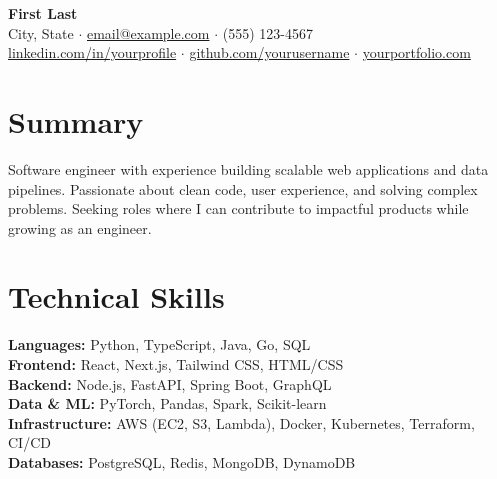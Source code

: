 \documentclass[11pt,letterpaper]{article}
\begin{document}
\begin{center}
    {\LARGE\bfseries\color{accent} %
    First Last} \\[4pt]
    City, State \quad $\cdot$ \quad
    \href{mailto:email@example.com}{email@example.com} \quad $\cdot$ \quad
    (555) 123-4567 \\
    \href{https://linkedin.com/in/yourprofile}{linkedin.com/in/yourprofile} \quad $\cdot$ \quad
    \href{https://github.com/yourusername}{github.com/yourusername} \quad $\cdot$ \quad
    \href{https://yourportfolio.com}{yourportfolio.com}
\end{center}

\section{Summary}
Software engineer with experience building scalable web applications and data pipelines. Passionate about clean code, user experience, and solving complex problems. Seeking roles where I can contribute to impactful products while growing as an engineer.

\section{Technical Skills}
\textbf{Languages:} Python, TypeScript, Java, Go, SQL \\
\textbf{Frontend:} React, Next.js, Tailwind CSS, HTML/CSS \\
\textbf{Backend:} Node.js, FastAPI, Spring Boot, GraphQL \\
\textbf{Data \& ML:} PyTorch, Pandas, Spark, Scikit-learn \\
\textbf{Infrastructure:} AWS (EC2, S3, Lambda), Docker, Kubernetes, Terraform, CI/CD \\
\textbf{Databases:} PostgreSQL, Redis, MongoDB, DynamoDB

\end{document}
